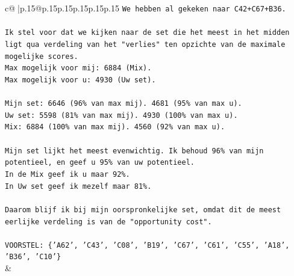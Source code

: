 \documentclass{article}
\begin{document}
{\begin{supertabular}{c@{$\;$}|p{.15\linewidth}@{}p{.15\linewidth}p{.15\linewidth}p{.15\linewidth}p{.15\linewidth}p{.15\linewidth}}
{{{\texttt{We hebben al gekeken naar C42+C67+B36.} \\
\\ 
\texttt{Ik stel voor dat we kijken naar de set die het meest in het midden ligt qua verdeling van het "verlies" ten opzichte van de maximale mogelijke scores.} \\
\texttt{Max mogelijk voor mij: 6884 (Mix).} \\
\texttt{Max mogelijk voor u: 4930 (Uw set).} \\
\\ 
\texttt{Mijn set: 6646 (96\% van max mij). 4681 (95\% van max u).} \\
\texttt{Uw set: 5598 (81\% van max mij). 4930 (100\% van max u).} \\
\texttt{Mix: 6884 (100\% van max mij). 4560 (92\% van max u).} \\
\\ 
\texttt{Mijn set lijkt het meest evenwichtig. Ik behoud 96\% van mijn potentieel, en geef u 95\% van uw potentieel.} \\
\texttt{In de Mix geef ik u maar 92\%.} \\
\texttt{In Uw set geef ik mezelf maar 81\%.} \\
\\ 
\texttt{Daarom blijf ik bij mijn oorspronkelijke set, omdat dit de meest eerlijke verdeling is van de "opportunity cost".} \\
\\ 
\texttt{VOORSTEL: \{'A62', 'C43', 'C08', 'B19', 'C67', 'C61', 'C55', 'A18', 'B36', 'C10'\}} \\
            }
        }
    }
    & \\ \\


\end{supertabular}}
\end{document}
